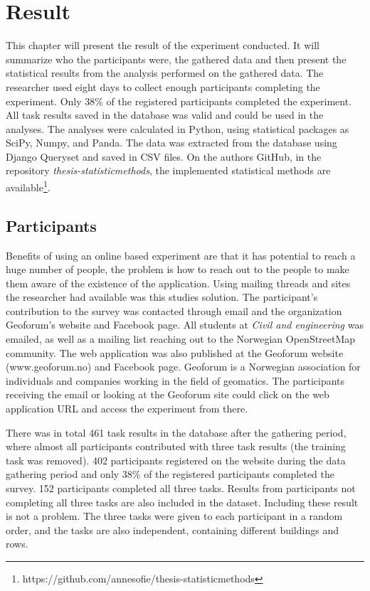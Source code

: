 \chapter{Result}
This chapter will present the result of the experiment conducted. It will summarize who the participants were, the gathered data and then present the statistical results from the analysis performed on the gathered data. The researcher used eight days to collect enough participants completing the experiment. Only 38\% of the registered participants completed the experiment. All task results saved in the database was valid and could be used in the analyses. The analyses were calculated in Python, using statistical packages as SciPy, Numpy, and Panda. The data was extracted from the database using Django Queryset and saved in CSV files. On the authors GitHub, in the repository \textit{thesis-statisticmethods}, the implemented statistical methods are available\footnote{https://github.com/annesofie/thesis-statisticmethods}. 

\section{Participants}
Benefits of using an online based experiment are that it has potential to reach a huge number of people, the problem is how to reach out to the people to make them aware of the existence of the application. Using mailing threads and sites the researcher had available was this studies solution. The participant's contribution to the survey was contacted through email and the organization Geoforum's website and Facebook page. All students at \textit{Civil and engineering} was emailed, as well as a mailing list reaching out to the Norwegian OpenStreetMap community. The web application was also published at the Geoforum website (www.geoforum.no) and Facebook page. 
Geoforum is a Norwegian association for individuals and companies working in the field of geomatics. The participants receiving the email or looking at the Geoforum site could click on the web application URL and access the experiment from there. 

There was in total 461 task results in the database after the gathering period, where almost all participants contributed with three task results (the training task was removed). 402 participants registered on the website during the data gathering period and only 38\% of the registered participants completed the survey. 152 participants completed all three tasks. Results from participants not completing all three tasks are also included in the dataset. Including these result is not a problem. The three tasks were given to each participant in a random order, and the tasks are also independent, containing different buildings and rows. %

